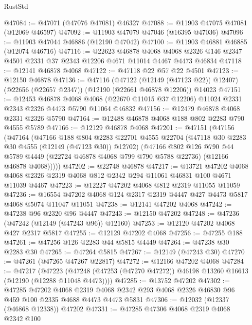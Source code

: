 \begin{lexlean}{RustStd}
\begin{coremodule}
@47084 := @47071 (@47076 @47081) @46327
@47088 := @11903 @47075 @47081 (@12069 @46597)
@47092 := @11903 @47079 @47046 (@16395 @47036)
@47096 := @11903 @47044 @46886 (@12190 @47042)
@47100 := @11903 @46881 @46885 (@12074 @46716)
@47116 := @22623
    @46878
    @4068
    @4068
    @2326
    @146
    @2347
    @4501
    @2331
    @37
    @2343
    @12206
    @4671
    @11014
    @4467
    @4473
    @46834
@47118 := @12141 @46878 @4068
@47122 := @47118 @22 @57 @22 @4501
@47123 := @12150 @46878
@47136 := @47116
    (@47122 (@12149 (@47123 @22)) @12407)
    (@22656 (@22657 @2347))
    (@12190 (@22661 @46878 @12206))
    @14023
@47151 := @12453
    @46878
    @4068
    @4068
    (@22670 @11015 @37 @12206)
    @11024
    @2331
    @2343
    @2326
    @4473
    @5790
    @11064
    @46832
@47156 := @12479 @46878 @4068 @2331 @2326 @5790
@47164 := @12488 @46878 @4068 @188 @802 @2283 @790 @4555 @5789
@47166 := @12129 @46878 @4068
@47201 := @47151
    (@47156
      (@47164
        (@47166
          @188
          @804
          @2283
          @22701
          @4555
          @22704
          (@47118 @30 @2283 @30 @4555 (@12149 (@47123 @30)) @12702)
          (@47166
            @802
            @126
            @790
            @44
            @5789
            @4449
            (@22724 @46878 @4068 @799 @790 @5788 @22736)
            (@12166 @46878 @4068)))))
@47202 := @22748 @46878
@47217 := @13721
    @47202
    @4068
    @4068
    @2326
    @2319
    @4068
    @812
    @2342
    @294
    @11061
    @46831
    @100
    @4671
    @11039
    @4467
@47223 := @12227 @47202 @4068 @812 @2319 @11055 @11059
@47236 := @16554 @47202 @4068 @124 @2317 @2319 @4447 @427 @4473 @5817 @4068 @5074 @11047 @11051
@47238 := @12141 @47202 @4068
@47242 := @47238 @96 @2320 @96 @4447
@47243 := @12150 @47202
@47248 := @47236 (@47242 (@12149 (@47243 @96)) @12160)
@47253 := @12120 @47202 @4068 @427 @2317 @5817
@47255 := @12129 @47202 @4068
@47256 := @47255 @188
@47261 := @47256 @126 @2283 @44 @5815 @4449
@47264 := @47238 @30 @2283 @30
@47265 := @47264 @5815
@47267 := @12149 (@47243 @30)
@47270 := @47261 (@47265 @47267 @22817)
@47272 := @12166 @47202 @4068
@47284 := @47217
    (@47223 (@47248 (@47253 (@47270 @47272)) @46198 @13260 @16613 (@12190 (@12288 @11048 @4473))))
@47285 := @13752 @47202
@47302 := @47285
    @47202
    @4068
    @2319
    @4068
    @2342
    @293
    @4068
    @2326
    @46830
    @96
    @459
    @100
    @2335
    @4688
    @4473
    @4473
    @5831
@47306 := @12032 (@12337 (@46868 @12338)) @47202
@47331 := @47285
    @47306
    @4068
    @2319
    @4068
    @2342
    @100

\end{coremodule}
\end{lexlean}
